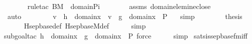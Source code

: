 \begin{isabellebody}
\ \ \ \ \ \ \isamarkupfalse%
{\isacharparenleft}{\kern0pt}rule{\isacharunderscore}{\kern0pt}tac\ B{\isacharequal}{\kern0pt}M\ \ domain{\isacharunderscore}{\kern0pt}Pi{\isacharparenright}{\kern0pt}\isanewline
\ \ \ \ \ \ \isamarkupfalse%
\ assms\ domain{\isacharunderscore}{\kern0pt}elem{\isacharunderscore}{\kern0pt}in{\isacharunderscore}{\kern0pt}eclose\ \isanewline
\ \ \ \ \ \ \isamarkupfalse%
\ auto\ \isanewline
\ \ \ \ \isamarkupfalse%
\ \isamarkupfalse%
\ {\isachardoublequoteopen}v\ {\isasymin}\ h\ {\isacharbackquote}{\kern0pt}{\isacharbackquote}{\kern0pt}\ domain{\isacharparenleft}{\kern0pt}x{\isacharparenright}{\kern0pt}\ {\isasymlongleftrightarrow}\ v\ {\isasymin}\ g\ {\isacharbackquote}{\kern0pt}{\isacharbackquote}{\kern0pt}\ {\isacharparenleft}{\kern0pt}domain{\isacharparenleft}{\kern0pt}x{\isacharparenright}{\kern0pt}\ {\isasymtimes}\ {\isacharbraceleft}{\kern0pt}P{\isacharbraceright}{\kern0pt}{\isacharparenright}{\kern0pt}\ {\isachardoublequoteclose}\ \isamarkupfalse%
\ simp\isanewline
\ \ \isamarkupfalse%
\isanewline
\isanewline
\ \ \isamarkupfalse%
\ \isamarkupfalse%
\ {\isacharquery}{\kern0pt}thesis\ \isanewline
\ \ \ \ \isamarkupfalse%
\ Hsep{\isacharunderscore}{\kern0pt}base{\isacharunderscore}{\kern0pt}def\ Hsep{\isacharunderscore}{\kern0pt}base{\isacharunderscore}{\kern0pt}M{\isacharunderscore}{\kern0pt}def\isanewline
\ \ \ \ \isamarkupfalse%
\ simp\isanewline
\ \ \ \ \isamarkupfalse%
{\isacharparenleft}{\kern0pt}subgoal{\isacharunderscore}{\kern0pt}tac\ {\isachardoublequoteopen}h\ {\isacharbackquote}{\kern0pt}{\isacharbackquote}{\kern0pt}\ domain{\isacharparenleft}{\kern0pt}x{\isacharparenright}{\kern0pt}\ {\isacharequal}{\kern0pt}\ g\ {\isacharbackquote}{\kern0pt}{\isacharbackquote}{\kern0pt}\ {\isacharparenleft}{\kern0pt}domain{\isacharparenleft}{\kern0pt}x{\isacharparenright}{\kern0pt}\ {\isasymtimes}\ {\isacharbraceleft}{\kern0pt}P{\isacharbraceright}{\kern0pt}{\isacharparenright}{\kern0pt}{\isachardoublequoteclose}{\isacharcomma}{\kern0pt}\ force{\isacharparenright}{\kern0pt}\isanewline
\ \ \ \ \isamarkupfalse%
\ simp\isanewline
{}\isamarkupfalse%
%
\endisatagproof
{\isafoldproof}%
%
\isadelimproof
\isanewline
%
\endisadelimproof
\isanewline
{}\isamarkupfalse%
\ sats{\isacharunderscore}{\kern0pt}is{\isacharunderscore}{\kern0pt}sep{\isacharunderscore}{\kern0pt}base{\isacharunderscore}{\kern0pt}fm{\isacharunderscore}{\kern0pt}iff\ {\isacharcolon}{\kern0pt}\ \isanewline

\end{isabellebody}
